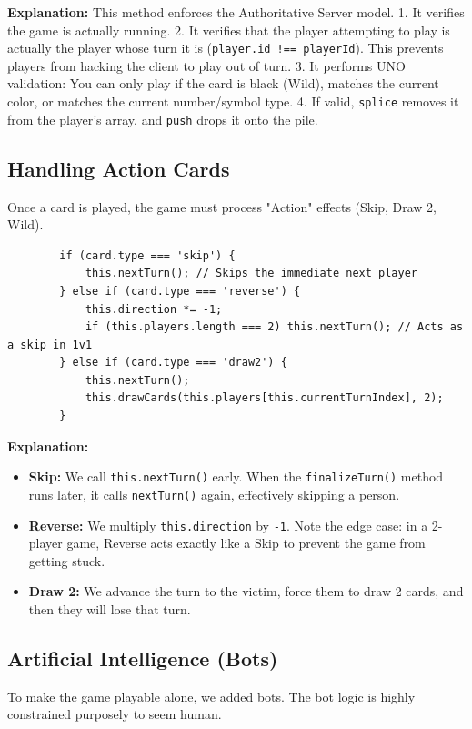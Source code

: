 \documentclass[11pt,a4paper]{article}
\begin{document}
\textbf{Explanation:} 
This method enforces the Authoritative Server model. 
1. It verifies the game is actually running.
2. It verifies that the player attempting to play is actually the player whose turn it is (\texttt{player.id !== playerId}). This prevents players from hacking the client to play out of turn.
3. It performs UNO validation: You can only play if the card is black (Wild), matches the current color, or matches the current number/symbol type.
4. If valid, \texttt{splice} removes it from the player's array, and \texttt{push} drops it onto the pile.

\subsection{Handling Action Cards}
Once a card is played, the game must process "Action" effects (Skip, Draw 2, Wild).

\begin{verbatim}
        if (card.type === 'skip') {
            this.nextTurn(); // Skips the immediate next player 
        } else if (card.type === 'reverse') {
            this.direction *= -1;
            if (this.players.length === 2) this.nextTurn(); // Acts as a skip in 1v1
        } else if (card.type === 'draw2') {
            this.nextTurn();
            this.drawCards(this.players[this.currentTurnIndex], 2);
        }
\end{verbatim}

\textbf{Explanation:}
\begin{itemize}
    \item \textbf{Skip:} We call \texttt{this.nextTurn()} early. When the \texttt{finalizeTurn()} method runs later, it calls \texttt{nextTurn()} again, effectively skipping a person.
    \item \textbf{Reverse:} We multiply \texttt{this.direction} by \texttt{-1}. Note the edge case: in a 2-player game, Reverse acts exactly like a Skip to prevent the game from getting stuck.
    \item \textbf{Draw 2:} We advance the turn to the victim, force them to draw 2 cards, and then they will lose that turn.
\end{itemize}

\subsection{Artificial Intelligence (Bots)}
To make the game playable alone, we added bots. The bot logic is highly constrained purposely to seem human.
\end{document}

